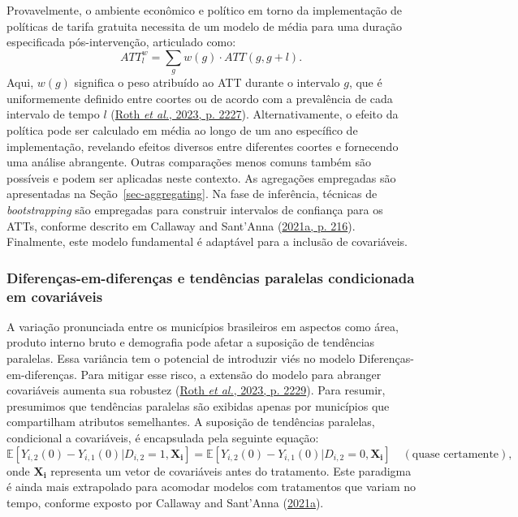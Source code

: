 \documentclass[12pt, a4paper, twoside]{article}
\numberwithin{equation}{subsection} %
\begin{document}
Provavelmente, o ambiente econômico e político em torno da implementação
de políticas de tarifa gratuita necessita de um modelo de média para uma
duração especificada pós-intervenção, articulado como: \begin{equation}
\label{eq-att-estimator-avg}
ATT_{l}^{w} = \sum_{g} w(g) \cdot ATT(g, g + l).
\end{equation} Aqui, \(w(g)\) significa o peso atribuído ao ATT durante
o intervalo \(g\), que é uniformemente definido entre coortes ou de
acordo com a prevalência de cada intervalo de tempo \(l\)
(\protect\hyperlink{ref-roth_whats_2023}{Roth \emph{et al.}, 2023, p.
2227}). Alternativamente, o efeito da política pode ser calculado em
média ao longo de um ano específico de implementação, revelando efeitos
diversos entre diferentes coortes e fornecendo uma análise abrangente.
Outras comparações menos comuns também são possíveis e podem ser
aplicadas neste contexto. As agregações empregadas são apresentadas na
Seção~\ref{sec-aggregating}. Na fase de inferência, técnicas de
\textit{bootstrapping} são empregadas para construir intervalos de
confiança para os ATTs, conforme descrito em Callaway and Sant'Anna
(\protect\hyperlink{ref-CALLAWAY2021200}{2021a, p. 216}). Finalmente,
este modelo fundamental é adaptável para a inclusão de covariáveis.

\hypertarget{sec-did-covariates}{%
\subsubsection{Diferenças-em-diferenças e tendências paralelas
condicionada em covariáveis
\hspace{0pt}\hspace{0pt}}\label{sec-did-covariates}}

A variação pronunciada entre os municípios brasileiros em aspectos como
área, produto interno bruto e demografia pode afetar a suposição de
tendências paralelas. Essa variância tem o potencial de introduzir viés
no modelo Diferenças-em-diferenças. Para mitigar esse risco, a extensão
do modelo para abranger covariáveis \hspace{0pt}\hspace{0pt}aumenta sua
robustez (\protect\hyperlink{ref-roth_whats_2023}{Roth \emph{et al.},
2023, p. 2229}). Para resumir, presumimos que tendências paralelas são
exibidas apenas por municípios que compartilham atributos semelhantes. A
suposição de tendências paralelas, condicional a covariáveis, é
encapsulada pela seguinte equação: \begin{equation}
\label{eq-parallel-trend-cond}
\mathbb{E}[Y_{i,2}(0) - Y_{i,1}(0) | D_{i,2} = 1, \boldsymbol{X_i}] = \mathbb{E}[Y_{i,2}(0) - Y_{i,1}(0) | D_{i,2} = 0, \boldsymbol{X_i}] \quad (\text{quase certamente}),
\end{equation} onde \(\boldsymbol{X_i}\) representa um vetor de
covariáveis \hspace{0pt}\hspace{0pt}antes do tratamento. Este paradigma
é ainda mais extrapolado para acomodar modelos com tratamentos que
variam no tempo, conforme exposto por Callaway and Sant'Anna
(\protect\hyperlink{ref-CALLAWAY2021200}{2021a}).
\end{document}
